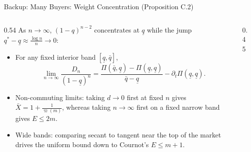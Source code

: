\documentclass[11pt,aspectratio=169,handout]{beamer}
\def\meditem{\smallskip\item}
\newcommand{\uq}{\underline q}
\newcommand{\oq}{\bar q}
\begin{document}
\begin{frame}[noframenumbering]{Backup: Many Buyers: Weight Concentration (Proposition C.2)}
\begin{columns}[T]
\begin{column}{0.54\textwidth}
As $n\to\infty$, $(1-q)^{n-2}$ concentrates at $\uq$ while the jump $q^*-\uq\approx\frac{\log n}{n}\to 0$:
\begin{itemize}
\item For any fixed interior band $[\uq,\oq]$,
\[
\lim_{n\to\infty}\frac{D_n}{(1-\uq)^n} = \frac{\Pi(\oq,\uq)-\Pi(\uq,\uq)}{\oq-\uq} - \partial_t\Pi(\uq,\uq).
\]
\meditem \alert{Non-commuting limits}: taking $d\to 0$ first at fixed $n$ gives $\bar X=1+\frac{1}{\varpi(m)}$, whereas taking $n\to\infty$ first on a fixed narrow band gives $E\le 2m$.
\meditem \alert{Wide bands}: comparing secant to tangent near the top of the market drives the uniform bound down to Cournot's $E\le m+1$.
\end{itemize}
\end{column}
\begin{column}{0.45\textwidth}
\centering
{}
\end{column}
\end{columns}
\end{frame}
\end{document}
